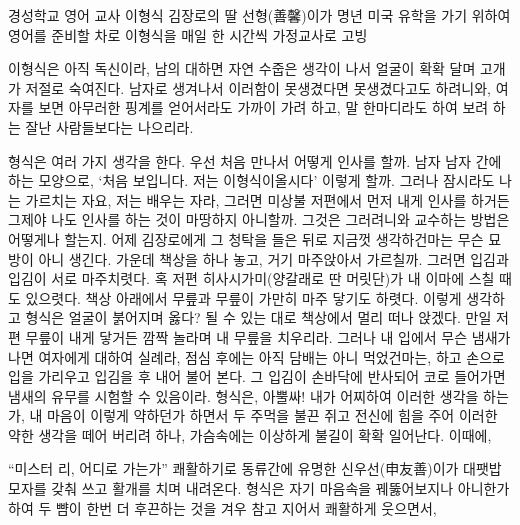 \documentclass{oblivoir}
\begin{document}
경성학교 영어 교사 이형식 김장로의 딸 선형(善馨)이가 명년 미국 유학을 가기 위하여 영어를 준비할 차로 이형식을 매일 한 시간씩 가정교사로 고빙

이형식은 아직 독신이라, 남의  대하면 자연 수줍은 생각이 나서 얼굴이 확확 달며 고개가 저절로 숙여진다. 남자로 생겨나서 이러함이 못생겼다면 못생겼다고도 하려니와, 여자를 보면 아무러한 핑계를 얻어서라도 가까이 가려 하고, 말 한마디라도 하여 보려 하는 잘난 사람들보다는 나으리라.

형식은 여러 가지 생각을 한다. 우선 처음 만나서 어떻게 인사를 할까. 남자 남자 간에 하는 모양으로, ‘처음 보입니다. 저는 이형식이올시다’ 이렇게 할까. 그러나 잠시라도 나는 가르치는 자요, 저는 배우는 자라, 그러면 미상불  저편에서 먼저 내게 인사를 하거든 그제야 나도 인사를 하는 것이 마땅하지 아니할까. 그것은 그러려니와 교수하는 방법은 어떻게나 할는지. 어제 김장로에게 그 청탁을 들은 뒤로 지금껏 생각하건마는 무슨 묘방이 아니 생긴다. 가운데 책상을 하나 놓고, 거기 마주앉아서 가르칠까. 그러면 입김과 입김이 서로 마주치렷다. 혹 저편 히사시가미(양갈래로 딴 머릿단)가 내 이마에 스칠 때도 있으렷다. 책상 아래에서 무릎과 무릎이 가만히 마주 닿기도 하렷다. 이렇게 생각하고 형식은 얼굴이 붉어지며 옳다? 될 수 있는 대로 책상에서 멀리 떠나 앉겠다. 만일 저편 무릎이 내게 닿거든 깜짝 놀라며 내 무릎을 치우리라. 그러나 내 입에서 무슨 냄새가 나면 여자에게 대하여 실례라, 점심 후에는 아직 담배는 아니 먹었건마는, 하고 손으로 입을 가리우고 입김을 후 내어 불어 본다. 그 입김이 손바닥에 반사되어 코로 들어가면 냄새의 유무를 시험할 수 있음이라. 형식은, 아뿔싸! 내가 어찌하여 이러한 생각을 하는가, 내 마음이 이렇게 약하던가 하면서 두 주먹을 불끈 쥐고 전신에 힘을 주어 이러한 약한 생각을 떼어 버리려 하나, 가슴속에는 이상하게 불길이 확확 일어난다. 이때에,

“미스터 리, 어디로 가는가”  쾌활하기로 동류간에 유명한 신우선(申友善)이가 대팻밥 모자를 갖춰 쓰고 활개를 치며 내려온다. 형식은 자기 마음속을 꿰뚫어보지나 아니한가 하여 두 뺨이 한번 더 후끈하는 것을 겨우 참고 지어서 쾌활하게 웃으면서, 

\newpage

\setlength{\sidebarwidth}{\dimexpr\foremargin-2em\relax}
\setlength{\sidebartopsep}{\dimexpr-\uppermargin+2\baselineskip\relax}
\setlength{\sidebarvsep}{.5ex}
\renewcommand*\sidebarfont{\footnotesize}
\renewcommand*\sidebarform{\RaggedRight}
\end{document}
